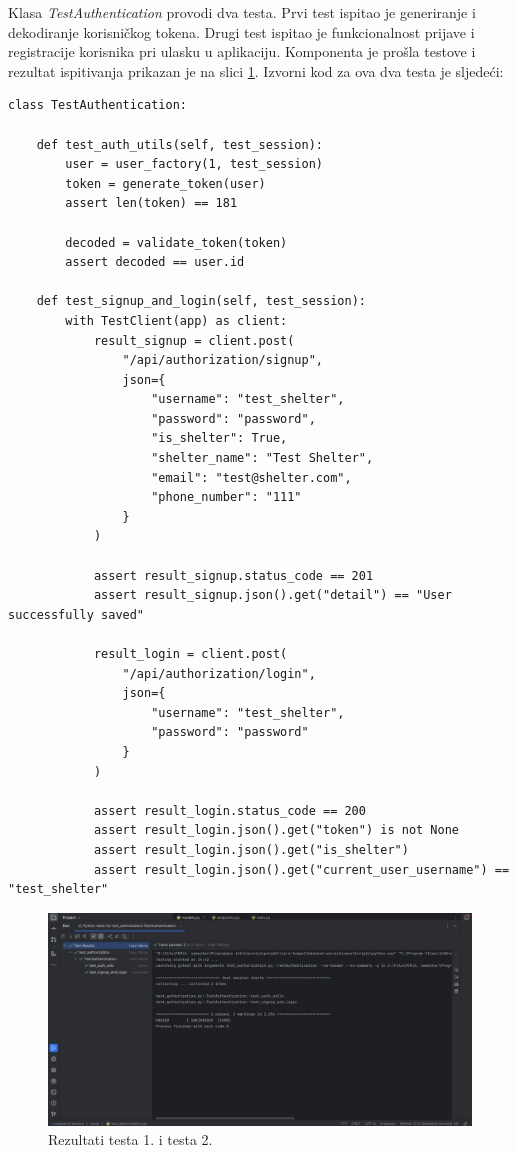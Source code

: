 			Klasa \textit{TestAuthentication} provodi dva testa. Prvi test ispitao je generiranje i dekodiranje korisničkog tokena. Drugi test ispitao je funkcionalnost prijave i registracije korisnika pri ulasku u aplikaciju. Komponenta je prošla testove i rezultat ispitivanja prikazan je na slici \ref{fig:test1i2}. Izvorni kod za ova dva testa je sljedeći: 
			\begin{lstlisting}
class TestAuthentication:

    def test_auth_utils(self, test_session):
        user = user_factory(1, test_session)
        token = generate_token(user)
        assert len(token) == 181

        decoded = validate_token(token)
        assert decoded == user.id

    def test_signup_and_login(self, test_session):
        with TestClient(app) as client:
            result_signup = client.post(
                "/api/authorization/signup",
                json={
                    "username": "test_shelter",
                    "password": "password",
                    "is_shelter": True,
                    "shelter_name": "Test Shelter",
                    "email": "test@shelter.com",
                    "phone_number": "111"
                }
            )

            assert result_signup.status_code == 201
            assert result_signup.json().get("detail") == "User successfully saved"

            result_login = client.post(
                "/api/authorization/login",
                json={
                    "username": "test_shelter",
                    "password": "password"
                }
            )

            assert result_login.status_code == 200
            assert result_login.json().get("token") is not None
            assert result_login.json().get("is_shelter")
            assert result_login.json().get("current_user_username") == "test_shelter"
			\end{lstlisting}

			\begin{figure}[H]
			 	\includegraphics[scale=0.42]{slike/test1i2.jpg} %
			 	\centering
			 	\caption{Rezultati testa 1. i testa 2.}
			 	\label{fig:test1i2}
			 \end{figure}

